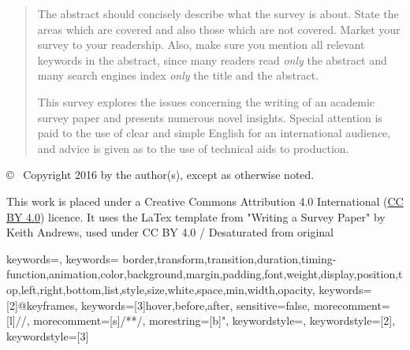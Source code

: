 \documentclass[11pt,onecolumn,twoside]{report}
\begin{document}
\begin{titlepage}
\begin{quote}
The abstract should concisely describe what the survey is about.
State the areas which are covered and also those which are not
covered. Market your survey to your readership. Also, make sure you
mention all relevant keywords in the abstract, since many readers read
\emph{only} the abstract and many search engines index \emph{only} the
title and the abstract.

This survey explores the issues concerning the writing of an academic
survey paper and presents numerous novel insights. Special attention
is paid to the use of clear and simple English for an international
audience, and advice is given as to the use of technical aids to
production.
\end{quote}

\vfill

\begin{center}
{\small\sffamily \copyright ~ Copyright 2016 by the author(s),
except as otherwise noted.}

\vspace{2mm}
{\footnotesize\sffamily This work is placed under a
Creative Commons Attribution 4.0 International
(\href{https://creativecommons.org/licenses/by/4.0/}{CC BY 4.0}) licence. It uses the LaTex template from "Writing a Survey Paper" by Keith Andrews, used under CC BY 4.0 / Desaturated from original
}
\end{center}

\end{titlepage}




\cleardoublepage
\pagestyle{plain}



{
\setlength{\parskip}{3pt plus 3pt minus 3pt}     %
\tableofcontents
{}

\cleardoublepage
\listoffigures
{}

\cleardoublepage
\listoftables
{}

\cleardoublepage
\renewcommand{\lstlistlistingname}{List of Listings}
\lstlistoflistings
{}
}

{ 
keywords={},
keywords={ border,transform,transition,duration,timing-function,animation,color,background,margin,padding,font,weight,display,position,top,left,right,bottom,list,style,size,white,space,min,width,opacity},
keywords=[2]{@keyframes},
keywords=[3]{hover,before,after},
sensitive=false, 
morecomment=[l]{//}, 
morecomment=[s]{/*}{*/}, 
morestring=[b]",
keywordstyle=\color{blue},
keywordstyle=[2]\color{violet},
keywordstyle=[3]\color{orange}
}
\end{document}
